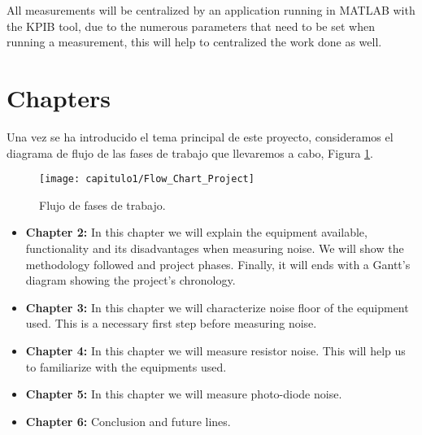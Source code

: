 All measurements will be centralized by an application running in MATLAB with the KPIB tool, due to the numerous parameters that need to be set when running a measurement, this will help to centralized the work done as well.

%
%
%
%
%
%
%
%
%
%
%
%
%
%
%
%
%
%
%

\section{Chapters}

Una vez se ha introducido el tema principal de este proyecto, consideramos el diagrama de flujo de las fases de trabajo que llevaremos a cabo, Figura \ref{fig:Flow_Chart_Project}.

\smallskip
\begin{figure}[H]%
\noindent \begin{centering}
\texttt{[image: capitulo1/Flow\_Chart\_Project]}
\par\end{centering}
\caption{\label{fig:Flow_Chart_Project} Flujo de fases de trabajo.}
\end{figure}
\smallskip




\begin{itemize}

\item \textbf{Chapter 2:} In this chapter we will explain the equipment available, functionality and its disadvantages when measuring noise. We will show the methodology followed and project phases. Finally, it will ends with a Gantt's diagram showing the project's chronology. 

\item \textbf{Chapter 3:} In this chapter we will characterize noise floor of the equipment used. This is a necessary first step before measuring noise.

\item \textbf{Chapter 4:} In this chapter we will measure resistor noise. This will help us to familiarize with the equipments used.

\item \textbf{Chapter 5:} In this chapter we will measure photo-diode noise.

\item \textbf{Chapter 6:} Conclusion and future lines.   
  
\end{itemize}

\newpage
\clearpage{\pagestyle{empty}\cleardoublepage}

